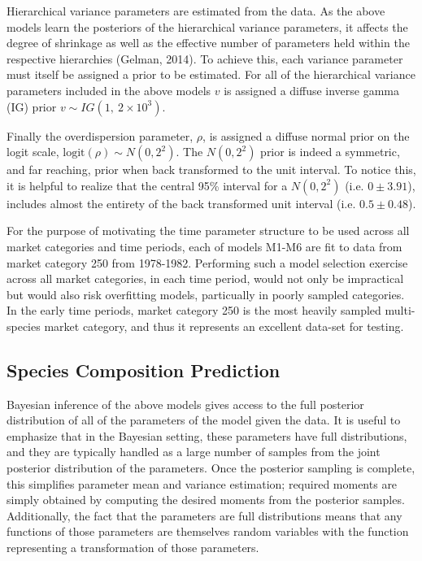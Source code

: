 \documentclass[12pt]{article}
\begin{document}
Hierarchical variance parameters are estimated from the data. As the
above models learn the posteriors of the hierarchical variance
parameters, it affects the degree of shrinkage as well as the effective
number of parameters held within the respective hierarchies (Gelman,
2014). To achieve this, each variance parameter must itself be assigned
a prior to be estimated. For all of the hierarchical variance parameters
included in the above models \(v\) is assigned a diffuse inverse gamma
(IG) prior \(v \sim IG(1,~2\times10^{3})\).

Finally the overdispersion parameter, \(\rho\), is assigned a diffuse
normal prior on the logit scale, \(\text{logit}(\rho) \sim N(0, 2^2)\).
The \(N(0, 2^2)\) prior is indeed a symmetric, and far reaching, prior
when back transformed to the unit interval. To notice this, it is
helpful to realize that the central 95\% interval for a \(N(0, 2^2)\)
(i.e. \(0\pm3.91\)), includes almost the entirety of the back
transformed unit interval (i.e. \(0.5\pm0.48\)).

For the purpose of motivating the time parameter structure to be used across 
all market categories and time periods, each of models M1-M6 are fit to data 
from market category 250 from 1978-1982. %
Performing such a model selection exercise across all market categories, in 
each time period, would not only be impractical but would also risk overfitting 
models, particually in poorly sampled categories. In the early time periods, 
market category 250 is the most heavily sampled multi-species market category, 
and thus it represents an excellent data-set for testing.


\subsection{Species Composition Prediction}\label{species-composition-prediction}

Bayesian inference of the above models gives access to the full
posterior distribution of all of the parameters of the model given the
data. It is useful to emphasize that in the Bayesian setting, these
parameters have full distributions, and they are typically handled as a
large number of samples from the joint posterior distribution of the
parameters. Once the posterior sampling is complete, this simplifies
parameter mean and variance estimation; required moments are simply
obtained by computing the desired moments from the posterior samples.
Additionally, the fact that the parameters are full distributions means
that any functions of those parameters are themselves random variables
with the function representing a transformation of those parameters.
\end{document}
